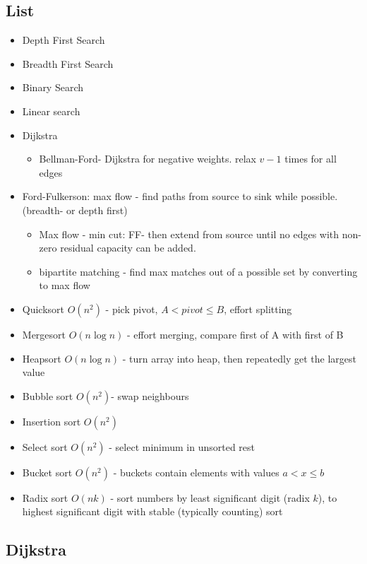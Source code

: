 \documentclass[10pt]{article}
\begin{document}
\subsection{List}
\begin{itemize}
\item Depth First Search
\item Breadth First Search
\item Binary Search
\item Linear search
\item Dijkstra
\begin{itemize}
\item Bellman-Ford- Dijkstra for negative weights. relax $v-1$ times for all edges
\end{itemize}
\item Ford-Fulkerson: max flow - find paths from source to sink while possible. (breadth- or depth first)
\begin{itemize}
\item Max flow - min cut: FF- then extend from source until no edges with non-zero residual capacity can be added.
\item bipartite matching - find max matches out of a possible set by converting to max flow
\end{itemize}
\item Quicksort $O(n^2)$ - pick pivot, $A<pivot \leq B$, effort splitting
\item Mergesort $O(n \log n)$ - effort merging, compare first of A with first of B
\item Heapsort $O(n \log n)$ - turn array into heap, then repeatedly get the largest value
\item Bubble sort $O(n^2)$- swap neighbours
\item Insertion sort $O(n^2)$
\item Select sort $O(n^2)$ - select minimum in unsorted rest
\item Bucket sort $O(n^2)$ - buckets contain elements with values $a < x \leq b$
\item Radix sort $O(nk)$ - sort numbers by least significant digit (radix $k$), to highest significant digit with stable (typically counting) sort
\end{itemize}

\subsection{Dijkstra}

\end{document}
